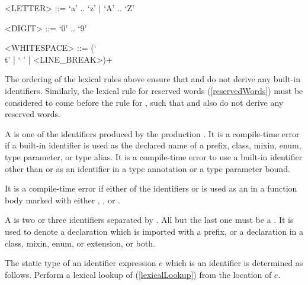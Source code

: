 \documentclass[makeidx]{article}
\begin{document}
{\begin{grammar}
<LETTER> ::= `a' .. `z' | `A' .. `Z'

<DIGIT> ::= `0' .. `9'

<WHITESPACE> ::= (`\\t' | ` ' | <LINE\_BREAK>)+
\end{grammar}

\LMHash{}%
The ordering of the lexical rules above ensure that 
and  do not derive any built-in identifiers.
Similarly, the lexical rule for reserved words (\ref{reservedWords})
must be considered to come before the rule for ,
such that  and 
also do not derive any reserved words.

\LMHash{}%
A  is one of
the identifiers produced by the production .
It is a compile-time error if a built-in identifier
is used as the declared name of
a prefix, class, mixin, enum, type parameter, or type alias.
It is a compile-time error to use a built-in identifier
other than \DYNAMIC{} or \FUNCTION{}
as an identifier in a type annotation or a type parameter bound.


\LMHash{}%
It is a compile-time error if either of the identifiers \AWAIT{} or \YIELD{}
is used as an  in a function body
marked with either \ASYNC, \code{\ASYNC*}, or \code{\SYNC*}.


\LMHash{}%
A  is two or three identifiers separated by .
All but the last one must be a .
It is used to denote a declaration which is imported with a prefix,
or a \STATIC{} declaration in a class, mixin, enum, or extension, or both.

\LMHash{}%
The static type of an identifier expression $e$ which is an identifier \id{}
is determined as follows.
Perform a lexical lookup of \id{}
(\ref{lexicalLookup})
from the location of $e$.

}
\end{document}
